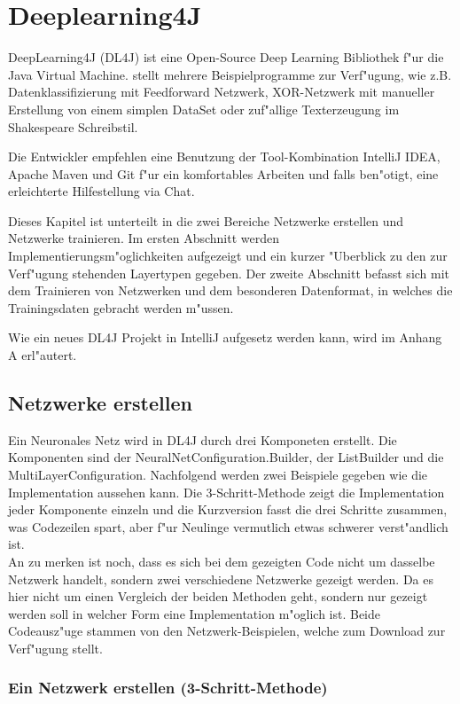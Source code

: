 \chapter{Deeplearning4J}
{
DeepLearning4J (DL4J) ist eine Open-Source Deep Learning Bibliothek f"ur die Java Virtual Machine. \cite{DL4J} stellt mehrere Beispielprogramme zur Verf"ugung, wie z.B. Datenklassifizierung mit Feedforward Netzwerk, XOR-Netzwerk mit manueller Erstellung von einem simplen DataSet oder zuf"allige Texterzeugung im Shakespeare Schreibstil.

Die Entwickler empfehlen eine Benutzung der Tool-Kombination IntelliJ IDEA, Apache Maven und Git f"ur ein komfortables Arbeiten und  falls ben"otigt, eine erleichterte Hilfestellung via Chat.

Dieses Kapitel ist unterteilt in die zwei Bereiche Netzwerke erstellen und Netzwerke trainieren. Im ersten Abschnitt werden Implementierungsm"oglichkeiten aufgezeigt und ein kurzer "Uberblick zu den zur Verf"ugung stehenden Layertypen gegeben. Der zweite Abschnitt befasst sich mit dem Trainieren von Netzwerken und dem besonderen Datenformat, in welches die Trainingsdaten gebracht werden m"ussen.

Wie ein neues DL4J Projekt in IntelliJ aufgesetz werden kann, wird im Anhang A erl"autert.


\section{Netzwerke erstellen}
Ein Neuronales Netz wird in DL4J durch drei Komponeten erstellt. Die Komponenten sind der NeuralNetConfiguration.Builder, der ListBuilder und die MultiLayerConfiguration. Nachfolgend werden zwei Beispiele gegeben wie die Implementation aussehen kann. Die 3-Schritt-Methode zeigt die Implementation jeder Komponente einzeln und die Kurzversion fasst die drei Schritte zusammen, was Codezeilen spart, aber f"ur Neulinge vermutlich etwas schwerer verst"andlich ist.\\
An zu merken ist noch, dass es sich bei dem gezeigten Code nicht um dasselbe Netzwerk handelt, sondern zwei verschiedene Netzwerke gezeigt werden. Da es hier nicht um einen Vergleich der beiden Methoden geht, sondern nur gezeigt werden soll in welcher Form eine Implementation m"oglich ist. Beide Codeausz"uge stammen von den Netzwerk-Beispielen, welche \cite{DL4J} zum Download zur Verf"ugung stellt.

\subsection{Ein Netzwerk erstellen (3-Schritt-Methode)}

}
